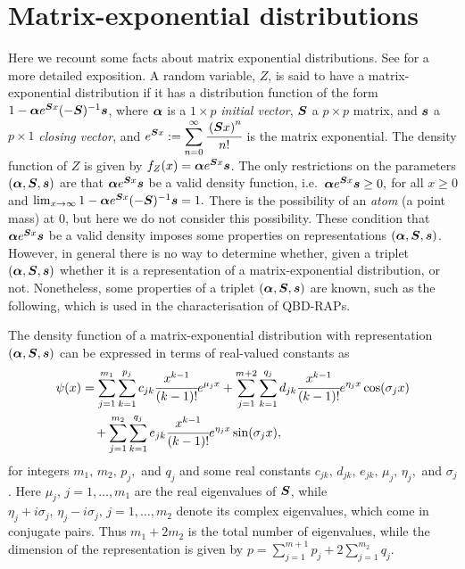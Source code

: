 \section{Matrix-exponential distributions}
Here we recount some facts about matrix exponential distributions. See \citep{MEinAP} for a more detailed exposition. A random variable, \(Z\), is said to have a matrix-exponential distribution if it has a distribution function of the form \(1-\boldsymbol \alpha e^{\boldsymbol Sx}(-\boldsymbol S)^{-1}\boldsymbol s\), where \(\boldsymbol \alpha\) is a \(1\times p\) \emph{initial vector}, \(\boldsymbol S\) a \(p\times p\) matrix, and \(\boldsymbol s\) a \(p\times 1\) \emph{closing vector}, and \(\displaystyle e^{\boldsymbol S x} := \sum_{n=0}^\infty \cfrac{\left(\boldsymbol Sx\right)^n}{n!}\) is the matrix exponential. The density function of \(Z\) is given by \(f_Z(x) = \boldsymbol\alpha e^{\boldsymbol S x}\boldsymbol s\). The only restrictions on the parameters \((\boldsymbol \alpha, \boldsymbol S, \boldsymbol s)\) are that \(\boldsymbol \alpha e^{\boldsymbol S x} \boldsymbol s\) be a valid density function, i.e.~\(\boldsymbol \alpha e^{\boldsymbol S x} \boldsymbol s\geq 0,\) for all \(x\geq 0\) and \(\lim_{x\to\infty} 1-\boldsymbol \alpha e^{\boldsymbol Sx}(-\boldsymbol S)^{-1}\boldsymbol s = 1.\) There is the possibility of an \emph{atom} (a point mass) at 0, but here we do not consider this possibility. These condition that \(\boldsymbol \alpha e^{\boldsymbol Sx}\boldsymbol s\) be a valid density imposes some properties on representations \((\boldsymbol \alpha, \boldsymbol S, \boldsymbol s)\). However, in general there is no way to determine whether, given a triplet \((\boldsymbol \alpha, \boldsymbol S, \boldsymbol s)\) whether it is a representation of a matrix-exponential distribution, or not. Nonetheless, some properties of a triplet \((\boldsymbol \alpha, \boldsymbol S, \boldsymbol s)\) are known, such as the following, which is used in the characterisation of QBD-RAPs. 
\begin{thm}
	The density function of a matrix-exponential distribution with representation \((\boldsymbol\alpha, \boldsymbol S, \boldsymbol s)\) can be expressed in terms of real-valued constants as 
	\begin{align}
		\psi(x)&=\sum_{j=1}^{m_1} \sum_{k=1}^{p_j} c_{jk} \cfrac{x^{k-1}}{(k-1)!} e^{\mu_jx} + \sum_{j=1}^{m+2}\sum_{k=1}^{q_j} d_{jk}\cfrac{x^{k-1}}{(k-1)!}e^{\eta_jx}\cos(\sigma_jx) \nonumber 
		\\&\quad{}+ \sum_{j=1}^{m_2}\sum_{k=1}^{q_j}e_{jk}\cfrac{x^{k-1}}{(k-1)!}e^{\eta_jx}\sin(\sigma_jx), \label{eqn: spec}
	\end{align}
	for integers \(m_1,\,m_2,\,p_j,\) and \(q_j\) and some real constants \(c_{jk},\,d_{jk},\,e_{jk},\,\mu_j,\,\eta_j,\) and \(\sigma_j\). Here \(\mu_j,\, j=1,\dots,m_1\) are the real eigenvalues of \(\boldsymbol S\), while \(\eta_j+i\sigma_j, \, \eta_j-i\sigma_j,\, j=1,\dots,m_2\) denote its complex eigenvalues, which come in conjugate pairs. Thus \(m_1+2m_2\) is the total number of eigenvalues, while the dimension of the representation is given by \(\displaystyle p=\sum_{j=1}^{m+1}p_j + 2\sum_{j=1}^{m_2}q_j\). 
\end{thm}
